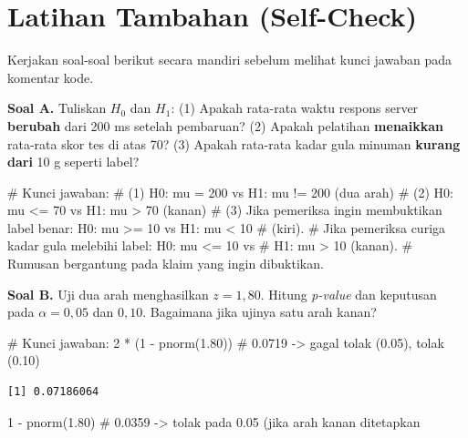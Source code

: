 \documentclass[
  indonesian,
  letterpaper,
]{book}
\newenvironment{Shaded}{\begin{snugshade}}{\end{snugshade}}
\newcommand{\CommentTok}[1]{\textcolor[rgb]{0.37,0.37,0.37}{#1}}
\newcommand{\DecValTok}[1]{\textcolor[rgb]{0.68,0.00,0.00}{#1}}
\newcommand{\FloatTok}[1]{\textcolor[rgb]{0.68,0.00,0.00}{#1}}
\newcommand{\FunctionTok}[1]{\textcolor[rgb]{0.28,0.35,0.67}{#1}}
\newcommand{\NormalTok}[1]{\textcolor[rgb]{0.00,0.23,0.31}{#1}}
\newcommand{\SpecialCharTok}[1]{\textcolor[rgb]{0.37,0.37,0.37}{#1}}
\begin{document}
\section{Latihan Tambahan
(Self-Check)}\label{latihan-tambahan-self-check-1}

Kerjakan soal-soal berikut secara mandiri sebelum melihat kunci jawaban
pada komentar kode.

\textbf{Soal A.} Tuliskan \(H_0\) dan \(H_1\): (1) Apakah rata-rata
waktu respons server \textbf{berubah} dari 200 ms setelah pembaruan? (2)
Apakah pelatihan \textbf{menaikkan} rata-rata skor tes di atas 70? (3)
Apakah rata-rata kadar gula minuman \textbf{kurang dari} 10 g seperti
label?

\begin{Shaded}
\begin{Highlighting}[]
\CommentTok{\# Kunci jawaban:}
\CommentTok{\# (1) H0: mu = 200 vs H1: mu != 200 (dua arah)}
\CommentTok{\# (2) H0: mu \textless{}= 70 vs H1: mu \textgreater{} 70 (kanan)}
\CommentTok{\# (3) Jika pemeriksa ingin membuktikan label benar: H0: mu \textgreater{}= 10 vs H1: mu \textless{} 10}
\CommentTok{\#     (kiri).}
\CommentTok{\#     Jika pemeriksa curiga kadar gula melebihi label: H0: mu \textless{}= 10 vs}
\CommentTok{\#     H1: mu \textgreater{} 10 (kanan).}
\CommentTok{\#     Rumusan bergantung pada klaim yang ingin dibuktikan.}
\end{Highlighting}
\end{Shaded}

\textbf{Soal B.} Uji dua arah menghasilkan \(z = 1{,}80\). Hitung
\emph{p-value} dan keputusan pada \(\alpha = 0{,}05\) dan \(0{,}10\).
Bagaimana jika ujinya satu arah kanan?

\begin{Shaded}
\begin{Highlighting}[]
\CommentTok{\# Kunci jawaban:}
\DecValTok{2} \SpecialCharTok{*}\NormalTok{ (}\DecValTok{1} \SpecialCharTok{{-}} \FunctionTok{pnorm}\NormalTok{(}\FloatTok{1.80}\NormalTok{))  }\CommentTok{\# 0.0719 {-}\textgreater{} gagal tolak (0.05), tolak (0.10)}
\end{Highlighting}
\end{Shaded}

\begin{verbatim}
[1] 0.07186064
\end{verbatim}

\begin{Shaded}
\begin{Highlighting}[]
\DecValTok{1} \SpecialCharTok{{-}} \FunctionTok{pnorm}\NormalTok{(}\FloatTok{1.80}\NormalTok{)        }\CommentTok{\# 0.0359 {-}\textgreater{} tolak pada 0.05 (jika arah kanan ditetapkan}
\end{Highlighting}
\end{Shaded}
\end{document}
